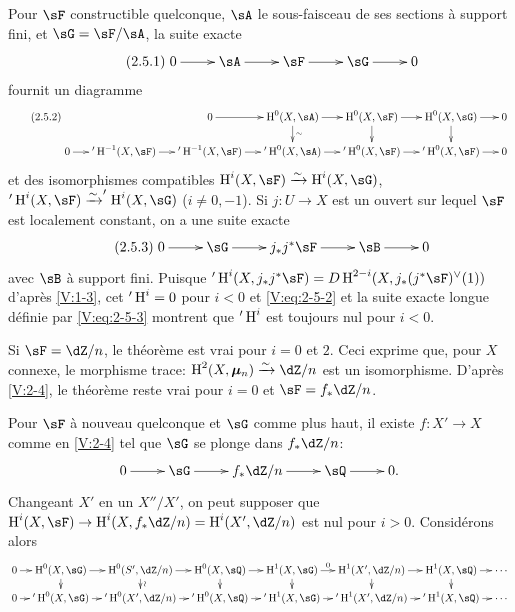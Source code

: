 Pour $\sF$ constructible quelconque, $\sA$ le sous-faisceau de ses sections à 
support fini, et $\sG=\sF/\sA$, la suite exacte 
\begin{equation*}\label{V:eq:2-5-1}\tag{2.5.1}
\xymatrix{
  0 \ar[r] 
    & \sA \ar[r] 
    & \sF \ar[r] 
    & \sG \ar[r] 
    & 0 
}
\end{equation*}
fournit un diagramme 
\begin{equation*}\tag{2.5.2}\label{V:eq:2-5-2}
\xymatrix@=.5cm{
  & & 0 \ar[r] 
    & \h^0(X,\sA) \ar[r] \ar[d]^-\sim 
    & \h^0(X,\sF) \ar[r] \ar[d] 
    & \h^0(X,\sG) \ar[r] \ar[d] 
    & 0 \\
  0 \ar[r] 
  & '\h^{-1}(X,\sF) \ar[r] 
  & '\h^{-1}(X,\sF) \ar[r] 
  & '\h^0(X,\sA) \ar[r] 
  & '\h^0(X,\sF) \ar[r] 
  & '\h^0(X,\sF) \ar[r] 
  & 0 
}
\end{equation*}
et des isomorphismes compatibles $\h^i(X,\sF)\iso \h^i(X,\sG)$, 
$'\h^i(X,\sF) \iso '\h^i(X,\sG)$ ($i\ne 0,-1$). Si $j:U\to X$ est un ouvert sur 
lequel $\sF$ est localement constant, on a une suite exacte 
\begin{equation*}\tag{2.5.3}\label{V:eq:2-5-3}
\xymatrix{
  0 \ar[r] 
    & \sG \ar[r] 
    & j_\ast j^\ast \sF \ar[r] 
    & \sB \ar[r] 
    & 0
}
\end{equation*}
avec $\sB$ à support fini. Puisque 
$'\h^i(X,j_\ast j^\ast\sF) = D \h^{2-i} (X,j_\ast(j^\ast\sF)^\vee(1))$ 
d'après \ref{V:1-3}, cet $'\operatorname{H}^i=0$ pour $i<0$ et \eqref{V:eq:2-5-2} et la 
suite exacte longue définie par \eqref{V:eq:2-5-3} montrent que $'\operatorname{H}^i$ est 
toujours nul pour $i<0$. 

Si $\sF=\dZ/n$, le théorème est vrai pour $i=0$ et $2$. Ceci exprime que, 
pour $X$ connexe, le morphisme trace: $\h^2(X,\dmu_n) \iso \dZ/n$ est un 
isomorphisme. D'après \ref{V:2-4}, le théorème reste vrai pour $i=0$ et 
$\sF=f_\ast\dZ/n$. 

Pour $\sF$ à nouveau quelconque et $\sG$ comme plus haut, il existe 
$f:X'\to X$ comme en \ref{V:2-4} tel que $\sG$ se plonge dans $f_\ast\dZ/n$:
\[\xymatrix{
  0 \ar[r] 
    & \sG \ar[r] 
    & f_\ast\dZ/n \ar[r] 
    & \sQ \ar[r] 
    & 0 \text{.}
}\]
Changeant $X'$ en un $X''/X'$, on peut supposer que 
$\h^i(X,\sF) \to \h^i(X,f_\ast\dZ/n) = \h^i(X',\dZ/n)$ est nul pour $i>0$. 
Considérons alors 
\[\xymatrix@=.3cm{
  0 \ar[r] 
    & \h^0(X,\sG) \ar[r] \ar[d] 
    & \h^0(S',\dZ/n) \ar[r] \ar[d]^-\wr 
    & \h^0(X,\sQ) \ar[r] \ar[d] 
    & \h^1(X,\sG) \ar[r]^-0 \ar[d] 
    & \h^1(X',\dZ/n) \ar[r] \ar[d] 
    & \h^1(X,\sQ) \ar[r] \ar[d] 
    & \cdots \\
  0 \ar[r] 
    & '\h^0(X,\sG) \ar[r] 
    & '\h^0(X',\dZ/n) \ar[r] 
    & '\h^0(X,\sQ) \ar[r] 
    & '\h^1(X,\sG) \ar[r] 
    & '\h^1(X',\dZ/n) \ar[r] 
    & '\h^1(X,\sQ) \ar[r] 
    & \cdots
}\]


